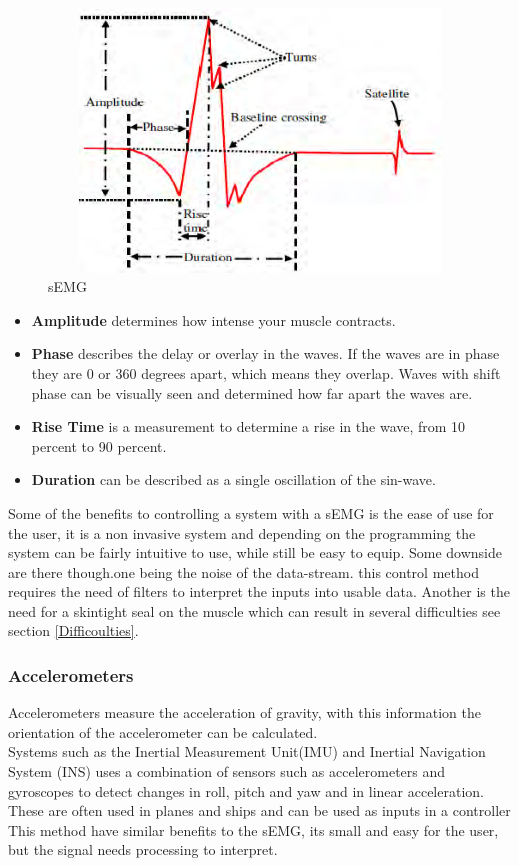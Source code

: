 \begin{figure}[H]
    \centering
    \includegraphics[width=12cm,height=7cm]{Figures/Contextual_figures/Characteristics-of-EMG-signal.png}
    \caption{sEMG \cite{sEMG}}
    \label{fig:sEMG}
\end{figure}

\begin{itemize}
  \item \textbf{Amplitude} determines how intense your muscle contracts.
    \item \textbf{Phase}  describes the delay or overlay in the waves. If the waves are in phase they are 0 or 360 degrees apart, which means they overlap. Waves with shift phase can be visually seen and determined how far apart the waves are.
    \item \textbf{Rise Time} is a measurement to determine a rise in the wave, from 10 percent to 90 percent.
    \item \textbf{Duration} can be described as a single oscillation of the sin-wave.
\end{itemize}

Some of the benefits to controlling a system with a sEMG is the ease of use for the user, it is a non invasive system and depending on the programming the system can be fairly intuitive to use, while still be easy to equip. 
Some downside are there though.one being the noise of the data-stream. this control method requires the need of filters to interpret the inputs into usable data. Another is the need for a skintight seal on the muscle which can result in several difficulties see section \ref{Difficoulties}.

\subsubsection{Accelerometers}
Accelerometers measure the acceleration of gravity, with this information the orientation of the accelerometer can be calculated.\\
Systems such as the Inertial Measurement Unit(IMU) and Inertial Navigation System (INS) uses a combination of sensors such as accelerometers and gyroscopes to detect changes in roll, pitch and yaw and in linear acceleration\cite{IMUWorki40:online}.\\ These are often used in planes and ships and can be used as inputs in a controller\\ 
This method have similar benefits to the sEMG, its small and easy for the user, but the signal needs processing to interpret.
\\ 
